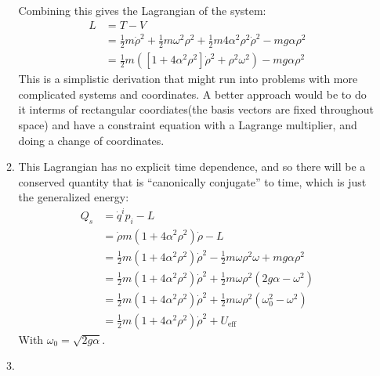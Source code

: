 \documentclass[12pt,a4]{article}
\begin{document}
\begin{enumerate}
\begin{enumerate}
        Combining this gives the Lagrangian of the system:
        \begin{align*}
          L &= T - V\\
            &= \frac{1}{2} m \dot\rho^2 + \frac{1}{2} m \omega^2 \rho^2 + \frac{1}{2}m4 \alpha^2 \rho^2 \dot \rho^2 - mg \alpha \rho^2\\
            &= \frac{1}{2} m \left(\left[1 + 4 \alpha^2 \rho^2\right]\dot\rho^2 + \rho^2\omega^2\right) - mg\alpha\rho^2
        \end{align*}
        This is a simplistic derivation that might run into problems with more complicated systems and coordinates.
        A better approach would be to do it interms of rectangular coordiates(the basis vectors are fixed throughout space) and have a constraint equation with a Lagrange multiplier, and doing a change of coordinates.
      \item
        This Lagrangian has no explicit time dependence, and so there will be a conserved quantity that is ``canonically conjugate'' to time, which is just the generalized energy:
        \begin{align*}
          Q_s &= \dot q^ip_i - L\\
              &= \dot\rho m \left(1 + 4 \alpha^2 \rho^2\right)\dot\rho - L \\
              &= \frac{1}{2} m \left(1 + 4 \alpha^2 \rho^2\right)\dot\rho^2 - \frac{1}{2} m\omega \rho^2 \omega + m g \alpha \rho^2 \\
              &= \frac{1}{2} m \left(1 + 4 \alpha^2 \rho^2\right)\dot\rho^2 + \frac{1}{2} m\omega \rho^2 \left(2 g \alpha - \omega^2\right) \\
              &= \frac{1}{2} m \left(1 + 4 \alpha^2 \rho^2\right)\dot\rho^2 + \frac{1}{2} m\omega \rho^2\left(\omega_0^2  - \omega^2\right) \\
              &= \frac{1}{2} m \left(1 + 4 \alpha^2 \rho^2\right)\dot\rho^2 + U_{\text{eff}}
        \end{align*}
        With $\omega_0 = \sqrt{2 g \alpha}$.
      \item 

\end{enumerate}
\end{enumerate}
\end{document}
